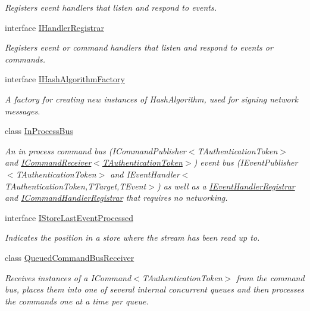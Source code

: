 \begin{DoxyCompactItemize}
\begin{DoxyCompactList}\small\item\em Registers event handlers that listen and respond to events. \end{DoxyCompactList}\item 
interface \hyperlink{interfaceCqrs_1_1Bus_1_1IHandlerRegistrar}{I\+Handler\+Registrar}
\begin{DoxyCompactList}\small\item\em Registers event or command handlers that listen and respond to events or commands. \end{DoxyCompactList}\item 
interface \hyperlink{interfaceCqrs_1_1Bus_1_1IHashAlgorithmFactory}{I\+Hash\+Algorithm\+Factory}
\begin{DoxyCompactList}\small\item\em A factory for creating new instances of Hash\+Algorithm, used for signing network messages. \end{DoxyCompactList}\item 
class \hyperlink{classCqrs_1_1Bus_1_1InProcessBus}{In\+Process\+Bus}
\begin{DoxyCompactList}\small\item\em An in process command bus (I\+Command\+Publisher$<$\+T\+Authentication\+Token$>$ and \hyperlink{interfaceCqrs_1_1Commands_1_1ICommandReceiver}{I\+Command\+Receiver$<$\+T\+Authentication\+Token$>$}) event bus (I\+Event\+Publisher$<$\+T\+Authentication\+Token$>$ and I\+Event\+Handler$<$\+T\+Authentication\+Token,\+T\+Target,\+T\+Event$>$) as well as a \hyperlink{interfaceCqrs_1_1Bus_1_1IEventHandlerRegistrar}{I\+Event\+Handler\+Registrar} and \hyperlink{interfaceCqrs_1_1Bus_1_1ICommandHandlerRegistrar}{I\+Command\+Handler\+Registrar} that requires no networking. \end{DoxyCompactList}\item 
interface \hyperlink{interfaceCqrs_1_1Bus_1_1IStoreLastEventProcessed}{I\+Store\+Last\+Event\+Processed}
\begin{DoxyCompactList}\small\item\em Indicates the position in a store where the stream has been read up to. \end{DoxyCompactList}\item 
class \hyperlink{classCqrs_1_1Bus_1_1QueuedCommandBusReceiver}{Queued\+Command\+Bus\+Receiver}
\begin{DoxyCompactList}\small\item\em Receives instances of a I\+Command$<$\+T\+Authentication\+Token$>$ from the command bus, places them into one of several internal concurrent queues and then processes the commands one at a time per queue. \end{DoxyCompactList}\item 

\end{DoxyCompactItemize}
